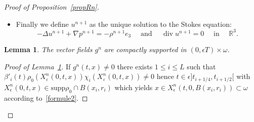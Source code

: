 \documentclass[10pt]{amsart}
\newtheorem{lemm}[theo]{Lemma}\newtheorem{prop}[theo]{Proposition}\newtheorem{coro}[theo]{Corollary}\newtheorem{conj}[theo]{Conjecture}
\theoremstyle{definition}\newtheorem{defi}[theo]{Definition}\newtheorem{rema}[theo]{Remark}\newtheorem{exam}[theo]{Example}\newtheorem{exem}[theo]{Example}\newtheorem{nota}[theo]{Notation}
\newcommand{\supp}{\mathrm{supp} }
\newcommand{\aux}{\mathrm{aux}}
\newcommand{\R}{\mathbb{R}}
\renewcommand{\leq}{\leqslant}
\renewcommand{\geq}{\geqslant}
\renewcommand{\div}{\operatorname{div}}
\newcommand{\eps}{\epsilon}
\begin{document}
\begin{proof}[Proof of Proposition~\ref{propRn}]
\begin{itemize}
\begin{align*}
\end{align*}
with $\beta_i(t) :=\beta\left(8(L+1)(t-t_i) \right) $ with $\beta$ a cutoff function such that $\beta=1 $ for $t\leq 1/2$ and $\beta=0$ for $t\geq 1$. We observe that $\rho^{n+1}$ satisfies weakly
\begin{equation}\label{n-den}
\begin{split}
\partial_t \rho^{n+1}+ \div \left((u^\eps_\aux+u^n)\rho^{n+1}\right) &=g^n \text{ on } \R^3 \\
\rho^{n+1}(0,\cdot)=\rho_0 \quad \text{ and } \quad
\rho^{n+1}(\eps T,\cdot) &=0,
\end{split}
\end{equation}
with
\[
g^n(t,x) := \underset{i=1}{\overset{L}{\sum}}\beta'_i(t) \rho_0(X^n_\varepsilon(0,t,x)) \chi_i(X^n_\varepsilon(0,t,x)).
\]
\item Finally we define $u^{n+1}$ as the unique solution to the Stokes equation:
\begin{equation}\label{n-sto}
-\Delta u^{n+1} + \nabla p^{n+1} =-\rho^{n+1}e_3 \quad \text{ and } \quad \div u^{n+1}= 0 \quad \text{ in } \quad \R^3.
\end{equation}
\end{itemize}

\begin{lemm}\label{lemmeRn}
The vector fields $g^n$ are compactly supported in $(0,\eps T)\times \omega$.
\end{lemm}
\begin{proof}[Proof of Lemma~\ref{lemmeRn}]
If $g^n(t,x)\neq 0$ there exists $1 \leq i \leq L$ such that $\beta'_i(t) \rho_0(X^n_\varepsilon(0,t,x)) \chi_i(X^n_\varepsilon(0,t,x))\neq 0$ hence $t\in \eps]t_{i+1/4},t_{i+1/2}[$ with $X_\eps^n(0,t,x)\in \supp \rho_0 \cap B(x_i, r_i)$ which yields $x \in X_\eps^n(t,0,B(x_i,r_i)) \subset \omega $ according to~\eqref{formule2}.
\end{proof}



\end{proof}
\end{document}
